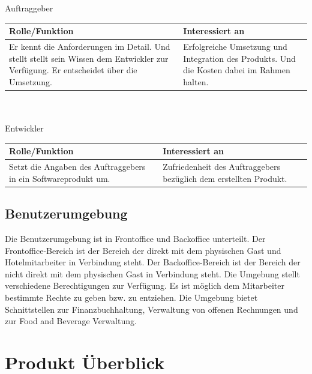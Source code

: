 \documentclass[10pt,a4paper,titlepage]{article}
\begin{document}
\\ 
\\ 
Auftraggeber\\
\begin{tabular}[t]{|p{5cm}|p{5cm}|}
    \hline
    \textbf{Rolle\slash{}Funktion} & \textbf{Interessiert an} \\
    \hline
	Er kennt die Anforderungen im Detail. Und stellt stellt sein Wissen dem Entwickler zur Verfügung. Er entscheidet über die Umsetzung. &
	Erfolgreiche Umsetzung und Integration des Produkts. Und die Kosten dabei im Rahmen halten. \\
    \hline
\end{tabular}
\\ 
\\ 
Entwickler\\
\begin{tabular}[t]{|p{5cm}|p{5cm}|}
    \hline
    \textbf{Rolle\slash{}Funktion} & \textbf{Interessiert an} \\
    \hline
Setzt die Angaben des Auftraggebers in ein Softwareprodukt um. &
	Zufriedenheit des Auftraggebers bezüglich dem erstellten Produkt.\\
    \hline
\end{tabular}

\subsection{Benutzerumgebung}
Die Benutzerumgebung ist in Frontoffice und Backoffice unterteilt. Der Frontoffice-Bereich ist der Bereich der direkt mit dem physischen Gast und Hotelmitarbeiter in Verbindung steht. Der Backoffice-Bereich ist der Bereich der nicht direkt mit dem physischen Gast in Verbindung steht. Die Umgebung stellt verschiedene Berechtigungen zur Verfügung. Es ist möglich dem Mitarbeiter bestimmte Rechte zu geben bzw. zu entziehen. Die Umgebung bietet Schnittstellen zur Finanzbuchhaltung, Verwaltung von offenen Rechnungen und zur Food and Beverage Verwaltung.

\section{Produkt Überblick}
\end{document}
